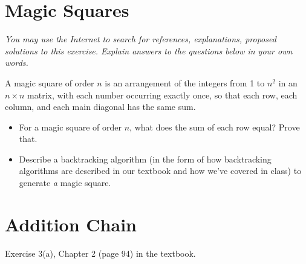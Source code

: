 \documentclass[12pt]{article}
\begin{document}
\section{Magic Squares}

\textit{You may use the Internet to search for references, explanations, proposed solutions to this exercise. Explain answers to the questions below in your own words.}

A magic square  of order $n$ is an arrangement of the integers from 1 to $n^2$ in an $n \times n$ matrix, with each number occurring exactly once, so that each row, each column, and each main diagonal has the same sum.

\begin{itemize}
    \item For a magic square of order $n$, what does the sum of each row equal? Prove that. 
    \item Describe a backtracking algorithm (in the form of how backtracking algorithms are described in our textbook and how we've covered in class) to generate \emph{a} magic square.
\end{itemize}



\section{Addition Chain}

Exercise 3(a), Chapter 2 (page 94) in the textbook.
\end{document}
